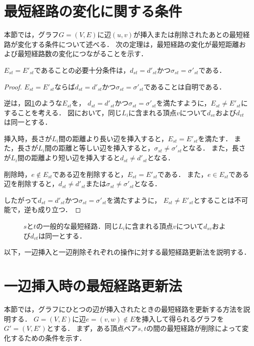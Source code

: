 \section{最短経路の変化に関する条件}
本節では，グラフ$G=(V,E)$に辺$(u,v)$が挿入または削除されたあとの最短経路が変化する条件について述べる．
次の定理は，最短経路の変化が最短距離および最短経路数の変化につながることを示す．
\begin{theorem}
  \label{thm:condition-of-invariability-of-shortest-path}
  $E_{st}=E'_{st}$であることの必要十分条件は，$d_{st}=d'_{st}$かつ$\sigma_{st}=\sigma'_{st}$である．
\end{theorem}
\begin{proof}
  $E_{st}=E'_{st}$ならば$d_{st}=d'_{st}$かつ$\sigma_{st}=\sigma'_{st}$であることは自明である．

  逆は，図\ref{fig:general-shortest-paths-weighted}のような$E_{st}$を，
  $d_{st}=d'_{st}$かつ$\sigma_{st}=\sigma'_{st}$を満たすように，$E_{st}\neq E'_{st}$にすることを考える．
  図において，同じ$L_i$に含まれる頂点$v$について$d_{sv}$および$d_{vt}$は同一とする．

  挿入時，長さが$L_i$間の距離より長い辺を挿入すると，$E_{st}=E'_{st}$を満たす．
  また，長さが$L_i$間の距離と等しい辺を挿入すると，$\sigma_{st}\neq\sigma'_{st}$となる．
  また，長さが$L_i$間の距離より短い辺を挿入すると$d_{st}\neq d'_{st}$となる．

  削除時，$e\notin E_{st}$である辺を削除すると，$E_{st}=E'_{st}$である．
  また，$e\in E_{st}$である辺を削除すると，$d_{st}\neq d'_{st}$または$\sigma_{st}\neq\sigma'_{st}$となる．

  したがって$d_{st}=d'_{st}$かつ$\sigma_{st}=\sigma'_{st}$を満たすように，
  $E_{st}\neq E'_{st}$とすることは不可能で，逆も成り立つ．

\end{proof}
\begin{figure}
  \centering
  \def\svgwidth{.5\columnwidth}
  
  \caption{$s$と$t$の一般的な最短経路．同じ$L_i$に含まれる頂点$v$について$d_{sv}$および$d_{vt}$は同一とする．}
  \label{fig:general-shortest-paths-weighted}
\end{figure}

以下，一辺挿入と一辺削除それぞれの操作に対する最短経路更新法を説明する．

\section{一辺挿入時の最短経路更新法}
\label{sect:update-apsp-on-insert}
本節では，グラフにひとつの辺が挿入されたときの最短経路を更新する方法を説明する．
$G=(V,E)$に辺$e=(v,w) \not\in E$を挿入して得られるグラフを$G'=(V,E')$とする．
まず，ある頂点ペア$s,t$の間の最短経路が削除によって変化するための条件を示す．

